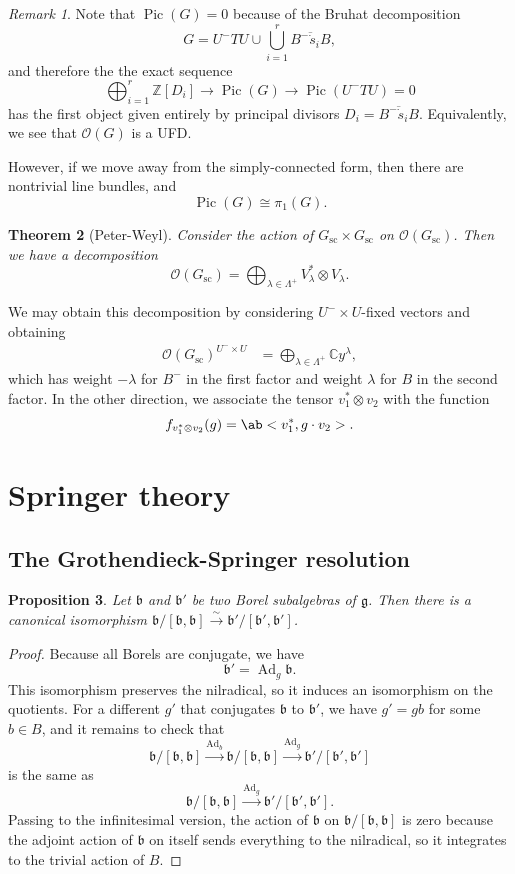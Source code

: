 \documentclass{amsart}
\newtheorem{thm}{Theorem}[section]
\newtheorem{prop}[thm]{Proposition}
\theoremstyle{definition}
\theoremstyle{remark}
\newtheorem{rmk}[thm]{Remark}
\theoremstyle{plain}
\theoremstyle{definition}
\theoremstyle{remark}
\newcommand{\C}{\mathbb{C}}
\newcommand{\Z}{\mathbb{Z}}
\newcommand{\g}{\mathfrak{g}}
\renewcommand{\b}{\mathfrak{b}}
\newcommand{\mc}[1]{\mathcal{#1}}
\newcommand{\on}[1]{\operatorname{#1}}
\newcommand{\ol}[1]{\overline{#1}}
\newcommand{\1}{\mathbf{1}}
\newcommand{\2}{\mathbf{2}}
\newcommand{\3}{\mathbf{3}}
\DeclareMathOperator{\Ad}{Ad}
\DeclareMathOperator{\Pic}{Pic}
\begin{document}
\begin{rmk}
    Note that \(\Pic (G) = 0\) because of the Bruhat decomposition
    \[ G = U^- T U \cup \bigcup_{i=1}^r \ol{B^- \dot{s}_i B}, \]
    and therefore the the exact sequence
    \[ \bigoplus_{i=1}^r \Z[D_i] \to \Pic(G) \to \Pic(U^- T U) = 0 \]
    has the first object given entirely by principal divisors \(D_i = \ol{B^- \dot{s}_i B}\). Equivalently, we see that \(\mc{O}(G)\) is a UFD.

    However, if we move away from the simply-connected form, then there are nontrivial line bundles, and
    \[ \Pic(G) \cong \pi_1(G). \]
\end{rmk}

\begin{thm}[Peter-Weyl]
    Consider the action of \(G_{\on{sc}} \times G_{\on{sc}}\) on \(\mc{O}(G_{\on{sc}})\). Then we have a decomposition
    \[ \mc{O}(G_{\on{sc}}) = \bigoplus_{\lambda \in \Lambda^+} V_{\lambda}^* \otimes V_{\lambda}. \]
\end{thm}

We may obtain this decomposition by considering \(U^- \times U\)-fixed vectors and obtaining
\begin{align*}
    \mc{O}(G_{\on{sc}})^{U^- \times U} &= \bigoplus_{\lambda \in \Lambda^+} \C y^{\lambda},
\end{align*}
which has weight \(-\lambda\) for \(B^-\) in the first factor and weight \(\lambda\) for \(B\) in the second factor. In the other direction, we associate the tensor \(v_1^* \otimes v_2\) with the function
\[ f_{v_1^* \otimes v_2}(g) = \ab< v_1^*, g \cdot v_2 >. \]

\section{Springer theory}%
\label{sec:Springer theory}

\subsection{The Grothendieck-Springer resolution}%
\label{sub:The Grothendieck-Springer resolution}

\begin{prop}
    Let \(\b\) and \(\b'\) be two Borel subalgebras of \(\g\). Then there is a canonical isomorphism \(\b / [\b, \b] \xrightarrow{\sim} \b' / [\b', \b']\).
\end{prop}

\begin{proof}
    Because all Borels are conjugate, we have
    \[ \b' = \Ad_g \b. \]
    This isomorphism preserves the nilradical, so it induces an isomorphism on the quotients. For a different \(g'\) that conjugates \(\b\) to \(\b'\), we have \(g' = g b\) for some \(b \in B\), and it remains to check that
    \[ \b / [\b, \b] \xrightarrow{\Ad_b} \b / [\b, \b] \xrightarrow{\Ad_g} \b' / [\b', \b'] \]
    is the same as 
    \[ \b / [\b, \b] \xrightarrow{\Ad_g} \b' / [\b', \b']. \]
    Passing to the infinitesimal version, the action of \(\b\) on \(\b / [\b, \b]\) is zero because the adjoint action of \(\b\) on itself sends everything to the nilradical, so it integrates to the trivial action of \(B\). 
\end{proof}
\end{document}
